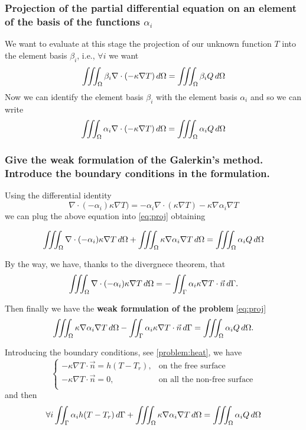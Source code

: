\subsubsection{Projection of the partial differential equation on an element of the basis of the functions $ \alpha_i $}
We want to evaluate at this stage the projection of our unknown function $ T $ into the element basis $ \beta_i $, i.e., $ \forall i $ we want 
\begin{equation}
\label{eq:proj}
\iiint_{\Omega}\beta_i\nabla\cdot(-\kappa\nabla T)\mathop{}\!d\Omega=\iiint_{\Omega}\beta_i Q\mathop{}\!d\Omega
\end{equation} 
Now we can identify the element basis $ \beta_i $ with the element basis $ \alpha_i $ and so we can write  
\[\iiint_{\Omega}\alpha_i\nabla\cdot(-\kappa\nabla T)\mathop{}\!d\Omega=\iiint_{\Omega}\alpha_i Q\mathop{}\!d\Omega \]

\subsubsection{Give the weak formulation of the Galerkin’s method. Introduce the boundary conditions in the formulation.}
\begin{mdframed}
	Using the differential identity 
	\[\nabla\cdot(-\alpha_i)\kappa\nabla T)=-\alpha_i\nabla\cdot(\kappa\nabla T)-\kappa\nabla\alpha_i\nabla T\]
	we can plug the above equation into \eqref{eq:proj} obtaining 
	
	\[\iiint_{\Omega}\nabla\cdot(-\alpha_i)\kappa\nabla T\mathop{}\!d\Omega+\iiint_{\Omega}\kappa\nabla\alpha_i\nabla T\mathop{}\!d\Omega=\iiint_{\Omega}\alpha_i Q\mathop{}\!d\Omega\]
	
	By the way, we have, thanks to the divergnece theorem, that 
	\[\iiint_{\Omega}\nabla\cdot(-\alpha_i)\kappa\nabla T\mathop{}\!d\Omega=-\iint_{\Gamma}\alpha_i\kappa\nabla T\cdot\vec{n}\mathop{}\!d\Gamma. \]
	
	Then finally we have the \textbf{weak formulation of the problem} \eqref{eq:proj}
	\[ \iiint_{\Omega}\kappa\nabla\alpha_i\nabla T\mathop{}\!d\Omega-\iint_{\Gamma}\alpha_i\kappa\nabla T\cdot\vec{n}\mathop{}\!d\Gamma=\iiint_{\Omega}\alpha_i Q\mathop{}\!d\Omega. \]
	\medskip
	
	Introducing the boundary conditions, see \eqref{problem:heat}, we have
	\[\begin{cases}
	-\kappa\nabla T\cdot \vec{n}=h(T-T_r),& \text{on the free surface}\\
	-\kappa\nabla T\cdot \vec{n}=0,&\text{on all the non-free surface}\\
	\end{cases}\]
	and then 
	\begin{equation}
	\forall i \iint_{\Gamma}\alpha_i h(T-T_r)\mathop{}\!d\Gamma+\iiint_{\Omega}\kappa\nabla\alpha_i\nabla T\mathop{}\!d\Omega =\iiint_{\Omega}\alpha_i Q\mathop{}\!d\Omega
	\end{equation}
\end{mdframed}
